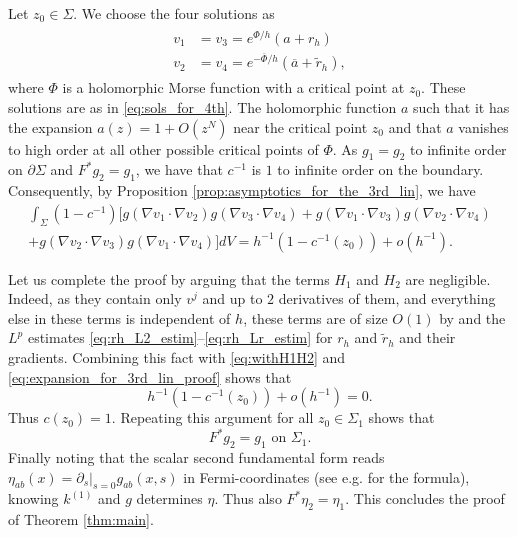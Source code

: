 \documentclass[12pt]{amsart}
\def\p{\partial}
\theoremstyle{definition}
\theoremstyle{remark}
\begin{document}
Let $z_0\in \Sigma$. We choose the four solutions as
\begin{align*}%
\begin{split}
 v_1&=v_3=e^{\Phi/h}(a+r_h) \\
 v_2&=v_4=e^{-\overline \Phi/h}(\overline a+\tilde r_h) ,
 \end{split}
\end{align*}
where $\Phi$ is a holomorphic Morse function with a critical point at $z_0$. These solutions are as in \eqref{eq:sols_for_4th}. 
The holomorphic function $a$ such that it has the expansion $a(z)=1+O(z^N)$ near the critical point $z_0$ and that $a$ vanishes to high order at all other possible critical points of $\Phi$. As $g_1=g_2$ to infinite order on $\p \Sigma$ and $F^*g_2=g_1$, we have that $c^{-1}$ is $1$ to infinite order on the boundary. Consequently, by Proposition \ref{prop:asymptotics_for_the_3rd_lin}, we have
\begin{multline}\label{eq:expansion_for_3rd_lin_proof}
\int_{\Sigma}(1-c^{-1})\Big[g(\nabla v_1\cdot \nabla v_2)g(\nabla v_3\cdot \nabla  v_4)+g(\nabla v_1\cdot \nabla v_3)g(\nabla v_2\cdot \nabla  v_4) \\
 +g(\nabla v_2\cdot \nabla v_3)g(\nabla v_1\cdot \nabla  v_4)\Big]dV=h^{-1}(1-c^{-1}(z_0))+o(h^{-1}).
 \end{multline}

Let us complete the proof by arguing that the terms $H_1$ and $H_2$ are negligible. Indeed, as they contain only $v^j$ and up to $2$ derivatives of them, and  everything else in these terms is independent of $h$, these terms are of size $O(1)$ by \cite[Theorem 7.7.5]{hormander2015analysis} and the $L^p$ estimates \eqref{eq:rh_L2_estim}--\eqref{eq:rh_Lr_estim} for $r_h$ and $\tilde r_h$ and their gradients. Combining this fact with \eqref{eq:withH1H2} and \eqref{eq:expansion_for_3rd_lin_proof} shows that
\[
 h^{-1}(1-c^{-1}(z_0))+o(h^{-1})=0.
\]
Thus $c(z_0)=1$. Repeating this argument for all $z_0\in \Sigma_1$ shows that
\[
 F^*g_2=g_1 \text{ on } \Sigma_1.
\]
Finally noting that the scalar second fundamental form reads $\eta_{ab}(x)=\p_s|_{s=0}g_{ab}(x,s)$ in Fermi-coordinates (see e.g. \cite{lassas2016calder} for the formula), knowing $k^{(1)}$ and $g$ determines $\eta$. Thus also $F^*\eta_2=\eta_1$. This concludes the proof of Theorem \ref{thm:main}.
\end{document}
